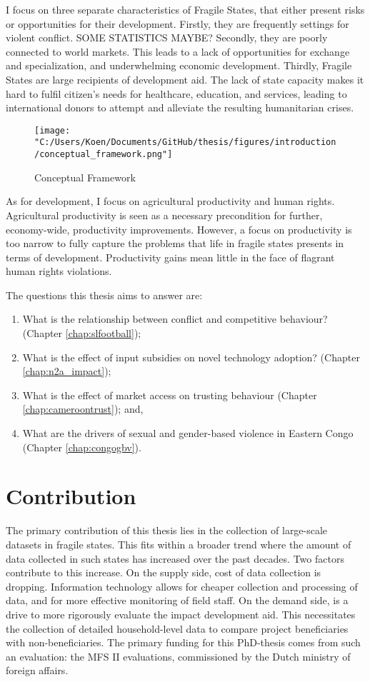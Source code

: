 I focus on three separate characteristics of Fragile States, that either present risks or opportunities for their development. Firstly, they are frequently settings for violent conflict. SOME STATISTICS MAYBE? Secondly, they are poorly connected to world markets. This leads to a lack of opportunities for exchange and specialization, and underwhelming economic development. Thirdly, Fragile States are large recipients of development aid. The lack of state capacity makes it hard to fulfil citizen's needs for healthcare, education, and services, leading to international donors to attempt and alleviate the resulting humanitarian crises.

\begin{figure}[htb]
  \centering
  \texttt{[image: "C:/Users/Koen/Documents/GitHub/thesis/figures/introduction/conceptual\_framework.png"]}
  \caption{Conceptual Framework}
  \label{fig:intro_framework}
\end{figure}

As for development, I focus on agricultural productivity and human rights. Agricultural productivity is seen as a necessary precondition for further, economy-wide, productivity improvements.  However, a focus on productivity is too narrow to fully capture the problems that life in fragile states presents in terms of development.   Productivity gains mean little in the face of flagrant human rights violations.

The questions this thesis aims to answer are:
\begin{enumerate}
	\item What is the relationship between conflict and competitive behaviour? (Chapter \ref{chap:slfootball});
	\item What is the effect of input subsidies on novel technology adoption? (Chapter \ref{chap:n2a_impact});
	\item What is the effect of market access on trusting behaviour (Chapter \ref{chap:cameroontrust}); and,
	\item What are the drivers of sexual and gender-based violence in Eastern Congo (Chapter \ref{chap:congogbv}).
\end{enumerate}

\section{Contribution}
The primary contribution of this thesis lies in the collection of large-scale datasets in fragile states. This fits within a broader trend where the amount of data collected in such states has increased over the past decades. Two factors contribute to this increase. On the supply side, cost of data collection is dropping. Information technology allows for cheaper collection and processing of data, and for more effective monitoring of field staff. On the demand side, is a drive to more rigorously evaluate the impact development aid. This necessitates the collection of detailed household-level data to compare project beneficiaries with non-beneficiaries. The primary funding for this PhD-thesis comes from such an evaluation: the MFS II evaluations, commissioned by the Dutch ministry of foreign affairs.

